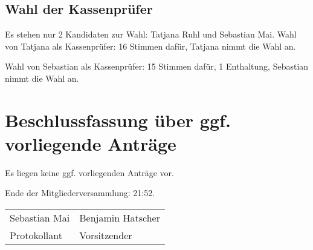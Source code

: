 \documentclass[a4paper,12pt,titlepage]{scrartcl}
\begin{document}
\subsection{ Wahl der Kassenprüfer }
Es stehen nur 2 Kandidaten zur Wahl: Tatjana Ruhl und Sebastian Mai.
Wahl von Tatjana als Kassenprüfer: 16 Stimmen dafür, Tatjana nimmt die Wahl an.

Wahl von Sebastian als Kassenprüfer: 15 Stimmen dafür, 1 Enthaltung, Sebastian nimmt die Wahl an.


\section{Beschlussfassung über ggf. vorliegende Anträge}
Es liegen keine ggf. vorliegenden Anträge vor.


Ende der Mitgliederversammlung: 21:52.


\nopagebreak
\vspace{10\baselineskip}
\begin{tabularx}{\textwidth}[b]{X X}
	\hline
	Sebastian Mai  & Benjamin Hatscher \\
	Protokollant & Vorsitzender
\end{tabularx}

\appendix
%
\end{document}
